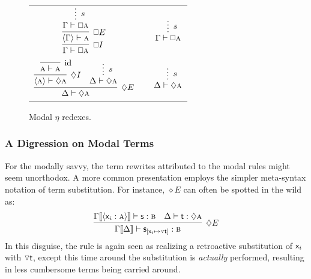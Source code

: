 \begin{figure}
	\centering
		\begin{tabularx}{0.8\textwidth}{@{}c@{\qquad}c@{\qquad}c@{}}
			$\infer[\bx I]{\Gamma \vdash \bx\prop{a}}{
			\infer[\bx E]{\bracket{\Gamma} \vdash \prop{a}}{
					\infer*[s]{\Gamma \vdash  \bx\prop{a}}{}
				}
			}
			$
			&
			\raisebox{5pt}{$\equiv$}
			&
			$\infer*[s]{\Gamma \vdash \bx\prop{a}}{}
			$\\[\smallsep]
			$\infer[\diamond E]{\Delta \vdash \diamond\prop{a}}{
				\infer[\diamond I]{\bracket{\prop{a}}\vdash \diamond \prop{a}}{
					\infer[\Ax]{\prop{a} \vdash \prop{a}}{}
				}
				&
				\infer*[s]{\Delta \vdash \diamond\prop{a}}{}
			}$
			&
			\raisebox{15pt}{$\equiv$}
			&
			$\infer*[s]{\Delta \vdash \diamond \prop{a}}{}
			$
		\end{tabularx}
	\caption{Modal $\eta$ redexes.}
	\label{subfigure:modal_eta_reductions}
\end{figure}

\subsubsection{A Digression on Modal Terms}
\label{subsubsection:digression}
For the modally savvy, the term rewrites attributed to the modal rules might seem unorthodox.
A more common presentation employs the simpler meta-syntax notation of term substitution.
For instance, $\diamond E$ can often be spotted in the wild as:
\[
	\infer[\diamond E]{\Gamma\ctx{\Delta} \vdash \term{s}_{[\term{\vari }\mapsto\term{\diaelim t}]}: \prop{b}}{
		\Gamma\ctx{\bracket{\term{\vari }:\prop{a}}}\vdash\term{s}:\prop{b}
		&
		\Delta \vdash \term{t}:\diamond\prop{a}
	}
\]
In this disguise, the rule is again seen as realizing a retroactive substitution of $\mathsf{\mathsf{x}_{\mathnormal{i}} }$ with $\smallterm{\diaelim t}$, except this time around the substitution is \textit{actually} performed, resulting in less cumbersome terms being carried around.

